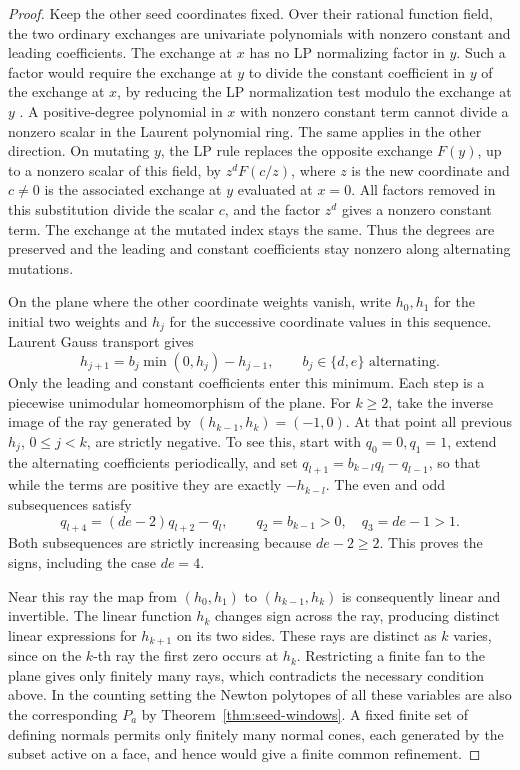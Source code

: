 \documentclass[11pt,reqno]{amsart}
\numberwithin{equation}{section}
\theoremstyle{definition}
\theoremstyle{remark}
\begin{document}
\begin{proof}
Keep the other seed coordinates fixed. Over their rational function
field, the two ordinary exchanges are univariate polynomials with
nonzero constant and leading coefficients. The exchange at \(x\)
has no LP normalizing factor in \(y\). Such a factor would require
the exchange at \(y\) to divide the constant coefficient in \(y\)
of the exchange at \(x\), by reducing the LP normalization test
modulo the exchange at \(y\) \cite[Lemma~2.7 and \S2.2]{LP}.
A positive-degree polynomial in
\(x\) with nonzero constant term cannot divide a nonzero scalar in
the Laurent polynomial ring. The same applies in the other
direction. On mutating \(y\), the LP rule replaces the opposite
exchange \(F(y)\), up to a nonzero scalar of this field, by
\(z^d F(c/z)\), where \(z\) is the new coordinate and \(c\ne0\)
is the associated exchange at \(y\) evaluated at \(x=0\).
All factors removed in this substitution divide the scalar \(c\),
and the factor \(z^d\) gives a nonzero constant term. The exchange at
the mutated index stays the same. Thus the degrees are preserved and
the leading and constant coefficients stay nonzero along alternating mutations.

On the plane where the other coordinate weights vanish, write
\(h_0,h_1\) for the initial two weights and \(h_j\) for the
successive coordinate values in this sequence. Laurent Gauss
transport gives
\[ h_{j+1}=b_j\min(0,h_j)-h_{j-1},\qquad b_j\in\{d,e\}\text{ alternating}. \]
Only the leading and constant coefficients enter this minimum. Each step
is a piecewise unimodular homeomorphism of the plane. For \(k\ge2\),
take the inverse image of the ray generated by
\((h_{k-1},h_k)=(-1,0)\). At that point all previous \(h_j\),
\(0\le j<k\), are strictly negative. To see this, start with
\(q_0=0,q_1=1\), extend the alternating coefficients periodically, and set
\(q_{l+1}=b_{k-l}q_l-q_{l-1}\), so that while the terms are
positive they are exactly \(-h_{k-l}\). The even and odd
subsequences satisfy
\[ q_{l+4}=(de-2)q_{l+2}-q_l, \qquad q_2=b_{k-1}>0,\quad q_3=de-1>1. \]
Both subsequences are strictly increasing because \(de-2\ge2\).
This proves the signs, including the case \(de=4\).

Near this ray the map from \((h_0,h_1)\) to \((h_{k-1},h_k)\)
is consequently linear and invertible. The linear function \(h_k\)
changes sign across the ray, producing distinct linear expressions
for \(h_{k+1}\) on its two sides. These rays are distinct as \(k\)
varies, since on the \(k\)-th ray the first zero occurs at \(h_k\).
Restricting a finite fan to the plane gives only finitely many rays,
which contradicts the necessary condition above. In the counting
setting the Newton polytopes of all these variables are also the
corresponding \(P_a\) by Theorem~\ref{thm:seed-windows}. A fixed
finite set of defining normals permits only finitely many normal
cones, each generated by the subset active on a face, and hence
would give a finite common refinement.


\end{proof}
\end{document}
